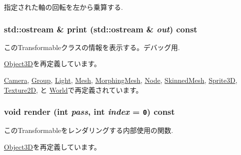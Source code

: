 指定された軸の回転を左から乗算する. \hypertarget{classm3g_1_1Transformable_6fea17fa1532df3794f8cb39cb4f911f}{
\subsubsection[{print}]{\setlength{\rightskip}{0pt plus 5cm}std::ostream \& print (std::ostream \& {\em out}) const}}
\label{classm3g_1_1Transformable_6fea17fa1532df3794f8cb39cb4f911f}


このTransformableクラスの情報を表示する。デバッグ用. 

\hyperlink{classm3g_1_1Object3D_6fea17fa1532df3794f8cb39cb4f911f}{Object3D}を再定義しています。

\hyperlink{classm3g_1_1Camera_6fea17fa1532df3794f8cb39cb4f911f}{Camera}, \hyperlink{classm3g_1_1Group_6fea17fa1532df3794f8cb39cb4f911f}{Group}, \hyperlink{classm3g_1_1Light_6fea17fa1532df3794f8cb39cb4f911f}{Light}, \hyperlink{classm3g_1_1Mesh_6fea17fa1532df3794f8cb39cb4f911f}{Mesh}, \hyperlink{classm3g_1_1MorphingMesh_6fea17fa1532df3794f8cb39cb4f911f}{MorphingMesh}, \hyperlink{classm3g_1_1Node_6fea17fa1532df3794f8cb39cb4f911f}{Node}, \hyperlink{classm3g_1_1SkinnedMesh_6fea17fa1532df3794f8cb39cb4f911f}{SkinnedMesh}, \hyperlink{classm3g_1_1Sprite3D_6fea17fa1532df3794f8cb39cb4f911f}{Sprite3D}, \hyperlink{classm3g_1_1Texture2D_6fea17fa1532df3794f8cb39cb4f911f}{Texture2D}, と \hyperlink{classm3g_1_1World_6fea17fa1532df3794f8cb39cb4f911f}{World}で再定義されています。\hypertarget{classm3g_1_1Transformable_1efcb1973989d9963d5bd6d03065d389}{
\subsubsection[{render}]{\setlength{\rightskip}{0pt plus 5cm}void render (int {\em pass}, \/  int {\em index} = {\tt 0}) const}}
\label{classm3g_1_1Transformable_1efcb1973989d9963d5bd6d03065d389}


このTransformableをレンダリングする内部使用の関数. 

\hyperlink{classm3g_1_1Object3D_1efcb1973989d9963d5bd6d03065d389}{Object3D}を再定義しています。

